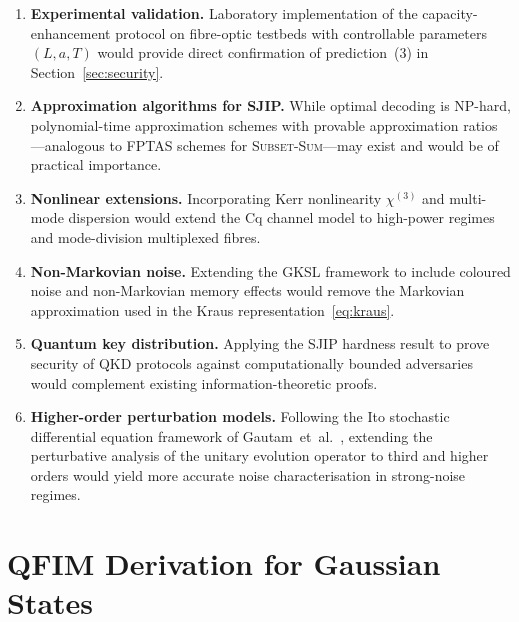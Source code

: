 \documentclass[journal,twocolumn]{IEEEtran}
\theoremstyle{definition}
\theoremstyle{plain}
\begin{document}
\begin{enumerate}[leftmargin=*, label=(\arabic*), itemsep=2pt]
  \item \textbf{Experimental validation.}  Laboratory implementation
    of the capacity-enhancement protocol on fibre-optic testbeds
    with controllable parameters $(L, a, T)$ would provide direct
    confirmation of prediction~(3) in Section~\ref{sec:security}.

  \item \textbf{Approximation algorithms for SJIP.}  While optimal
    decoding is NP-hard, polynomial-time approximation schemes with
    provable approximation ratios---analogous to FPTAS schemes for
    \textsc{Subset-Sum}---may exist and would be of practical
    importance.

  \item \textbf{Nonlinear extensions.}  Incorporating Kerr
    nonlinearity $\chi^{(3)}$ and multi-mode dispersion would
    extend the Cq channel model to high-power regimes and
    mode-division multiplexed fibres.

  \item \textbf{Non-Markovian noise.}  Extending the GKSL framework
    to include coloured noise and non-Markovian memory effects would
    remove the Markovian approximation used in the Kraus
    representation~\eqref{eq:kraus}.

  \item \textbf{Quantum key distribution.}  Applying the
    SJIP hardness result to prove security of QKD protocols against
    computationally bounded adversaries would complement existing
    information-theoretic proofs.

  \item \textbf{Higher-order perturbation models.}  Following
    the Ito stochastic differential equation framework of
    Gautam~et~al.~\cite{gautam2015a}, extending the perturbative
    analysis of the unitary evolution operator to third and higher
    orders would yield more accurate noise characterisation in
    strong-noise regimes.
\end{enumerate}

\appendices

\section{QFIM Derivation for Gaussian States}
\label{app:qfim}
\end{document}
